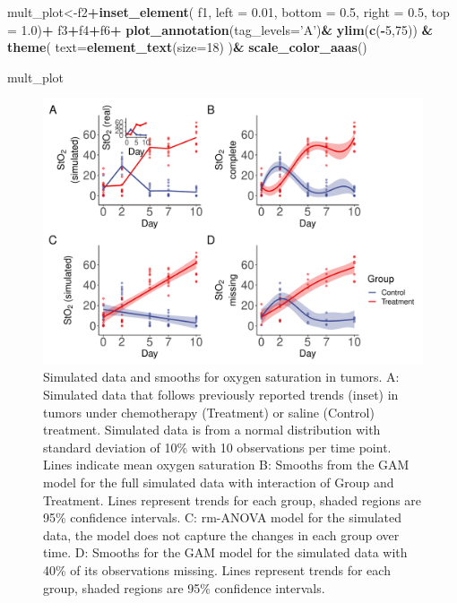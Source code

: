 \documentclass[
]{article}
\newenvironment{Shaded}{\begin{snugshade}}{\end{snugshade}}
\newcommand{\DataTypeTok}[1]{\textcolor[rgb]{0.13,0.29,0.53}{#1}}
\newcommand{\DecValTok}[1]{\textcolor[rgb]{0.00,0.00,0.81}{#1}}
\newcommand{\FloatTok}[1]{\textcolor[rgb]{0.00,0.00,0.81}{#1}}
\newcommand{\KeywordTok}[1]{\textcolor[rgb]{0.13,0.29,0.53}{\textbf{#1}}}
\newcommand{\NormalTok}[1]{#1}
\newcommand{\OperatorTok}[1]{\textcolor[rgb]{0.81,0.36,0.00}{\textbf{#1}}}
\newcommand{\StringTok}[1]{\textcolor[rgb]{0.31,0.60,0.02}{#1}}
\begin{document}
\begin{Shaded}
\begin{Highlighting}[]
\NormalTok{mult_plot<-f2}\OperatorTok{+}\KeywordTok{inset_element}\NormalTok{(}
\NormalTok{  f1, }\DataTypeTok{left =} \FloatTok{0.01}\NormalTok{, }
  \DataTypeTok{bottom =} \FloatTok{0.5}\NormalTok{, }
  \DataTypeTok{right =} \FloatTok{0.5}\NormalTok{, }
  \DataTypeTok{top =} \FloatTok{1.0}\NormalTok{)}\OperatorTok{+}
\StringTok{  }\NormalTok{f3}\OperatorTok{+}\NormalTok{f4}\OperatorTok{+}\NormalTok{f6}\OperatorTok{+}
\StringTok{   }\KeywordTok{plot_annotation}\NormalTok{(}\DataTypeTok{tag_levels=}\StringTok{'A'}\NormalTok{)}\OperatorTok{&}
\StringTok{   }\KeywordTok{ylim}\NormalTok{(}\KeywordTok{c}\NormalTok{(}\OperatorTok{-}\DecValTok{5}\NormalTok{,}\DecValTok{75}\NormalTok{)) }\OperatorTok{&}
\StringTok{  }\KeywordTok{theme}\NormalTok{(}
     \DataTypeTok{text=}\KeywordTok{element_text}\NormalTok{(}\DataTypeTok{size=}\DecValTok{18}\NormalTok{)}
\NormalTok{     )}\OperatorTok{&}
\StringTok{  }\KeywordTok{scale_color_aaas}\NormalTok{()}

\NormalTok{mult_plot}
\end{Highlighting}
\end{Shaded}

\begin{figure}[!h]

{\centering \includegraphics[width=0.75\linewidth,]{Full_document_files/figure-latex/sim-smooth-plot-Appendix-1} 

}

\caption{Simulated data and smooths for oxygen saturation in tumors. A: Simulated data that follows previously reported trends (inset) in tumors under chemotherapy (Treatment) or saline (Control) treatment. Simulated data is from a normal distribution with standard deviation of 10\% with 10 observations per time point. Lines indicate mean oxygen saturation B: Smooths from the GAM model for the full simulated data with interaction of Group and Treatment. Lines represent trends for each group, shaded regions are 95\% confidence intervals. C: rm-ANOVA model for the simulated data, the model does not capture the changes in each group over time. D: Smooths for the GAM model for the simulated data with 40\% of its observations missing. Lines represent trends for each group, shaded regions are 95\% confidence intervals.}\label{fig:sim-smooth-plot-Appendix}
\end{figure}
\end{document}
